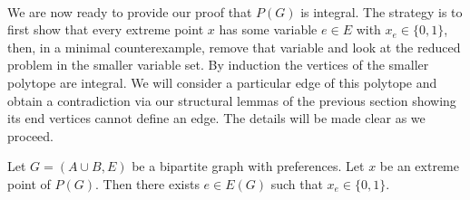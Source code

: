 \paragraph{}
We are now ready to provide our proof that $P(G)$ is integral. The strategy is to first show that every extreme point $x$ has some variable $e \in E$ with $x_e \in \{0,1\}$, then, in a minimal counterexample, remove that variable and look at the reduced problem in the smaller variable set. By induction the vertices of the smaller polytope are integral. We will consider a particular edge of this polytope and obtain a contradiction via our structural lemmas of the previous section showing its end vertices cannot define an edge. The details will be made clear as we proceed.
\begin{lemma}\label{lemma:01}
Let $G = (A\cup B, E)$ be a bipartite graph with preferences. Let $x$ be an extreme point of $P(G)$. Then there exists $e \in E(G)$ such that $x_e \in \{0,1\}$.
\end{lemma}
